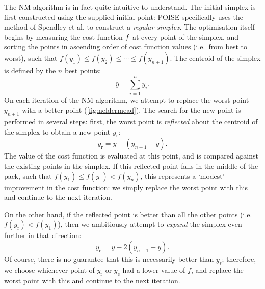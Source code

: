 The NM algorithm is in fact quite intuitive to understand.
The initial simplex is first constructed using the supplied initial point: POISE specifically uses the method of Spendley et al.\autocite{Spendley1962T} to construct a \textit{regular simplex}.
The optimisation itself begins by measuring the cost function $f\/$ at every point of the simplex, and sorting the points in ascending order of cost function values (i.e.\ from best to worst), such that $f(y_1) \leq f(y_2) \leq \cdots \leq f(y_{n+1})$.
The centroid of the simplex is defined by the $n$ best points:
\begin{equation}
    \label{eq:simplex_centroid}
    \bar{y} = \sum_{i=1}^n y_i.
\end{equation}
On each iteration of the NM algorithm, we attempt to replace the worst point $y_{n+1}$  with a better point (\cref{fig:neldermead}).
The search for the new point is performed in several steps: first, the worst point is \textit{reflected} about the centroid of the simplex to obtain a new point $y_\text{r}$:
\begin{equation}
    \label{eq:nm_reflect}
    y_\text{r} = \bar{y} - (y_{n+1} - \bar{y}).
\end{equation}
The value of the cost function is evaluated at this point, and is compared against the existing points in the simplex.
If this reflected point falls in the middle of the pack, such that $f(y_1) \leq f(y_\text{r}) < f(y_n)$, this represents a `modest' improvement in the cost function: we simply replace the worst point with this and continue to the next iteration.

On the other hand, if the reflected point is better than all the other points (i.e.\ $f(y_\text{r}) < f(y_1)$), then we ambitiously attempt to \textit{expand} the simplex even further in that direction:
\begin{equation}
    \label{eq:nm_expand}
    y_\text{e} = \bar{y} - 2(y_{n+1} - \bar{y}).
\end{equation}
Of course, there is no guarantee that this is necessarily better than $y_\text{r}$; therefore, we choose whichever point of $y_\text{r}$ or $y_\text{e}$ had a lower value of $f$, and replace the worst point with this and continue to the next iteration.

